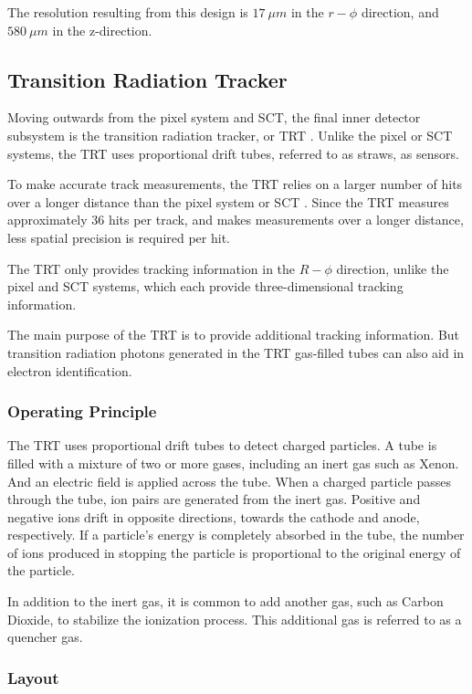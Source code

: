 The resolution resulting from this design is $17~\mu m$ in the $r-\phi$ direction, and $580~\mu m$ in the z-direction.\cite{sct-2010}

\subsection{Transition Radiation Tracker}\label{subsec:trt}
Moving outwards from the pixel system and SCT, the final inner detector subsystem is the transition radiation tracker, or TRT .
Unlike the pixel or SCT systems, the TRT uses proportional drift tubes, referred to as straws, as sensors.

To make accurate track measurements, the TRT relies on a larger number of hits over a longer distance than the pixel system or SCT .
Since the TRT measures approximately 36 hits per track, and makes measurements over a longer distance,
less spatial precision is required per hit.\cite{atlas-detector-2008}

The TRT only provides tracking information in the $R-\phi$ direction, unlike the pixel and SCT systems,
which each provide three-dimensional tracking information.

The main purpose of the TRT is to provide additional tracking information.
But transition radiation photons generated in the TRT gas-filled tubes can also aid in electron identification.\cite{atlas-detector-2008}

\subsubsection{Operating Principle}
The TRT uses proportional drift tubes to detect charged particles.
A tube is filled with a mixture of two or more gases, including an inert gas such as Xenon.
And an electric field is applied across the tube.
When a charged particle passes through the tube, ion pairs are generated from the inert gas.
Positive and negative ions drift in opposite directions, towards the cathode and anode, respectively.
If a particle's energy is completely absorbed in the tube, the number of ions produced in stopping the particle is
proportional to the original energy of the particle.\cite{knoll-2000}

In addition to the inert gas, it is common to add another gas, such as Carbon Dioxide, to stabilize the ionization process.
This additional gas is referred to as a quencher gas.

\subsubsection{Layout}

